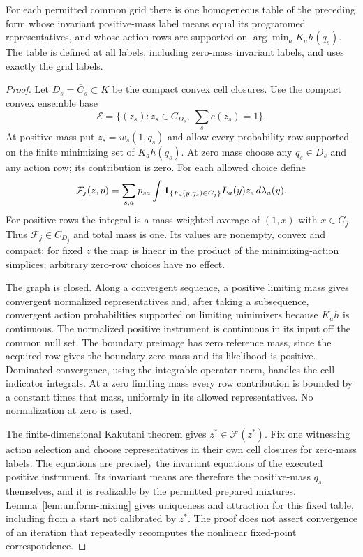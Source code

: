 \begin{lemma}\label{lem:fixedpoint}
For each permitted common grid there is one homogeneous table of the preceding form whose invariant positive-mass label means equal its programmed representatives, and whose action rows are supported on $\arg\min_a K_ah(q_s)$. The table is defined at all labels, including zero-mass invariant labels, and uses exactly the grid labels.
\end{lemma}
\begin{proof}
Let $D_s=\overline C_s\subset K$ be the compact convex cell closures. Use the compact convex ensemble base
\[
 \mathcal E=\{(z_s):z_s\in C_{D_s},\ \sum_s e(z_s)=1\}.
\]
At positive mass put $z_s=w_s(1,q_s)$ and allow every probability row supported on the finite minimizing set of $K_ah(q_s)$. At zero mass choose any $q_s\in D_s$ and any action row; its contribution is zero. For each allowed choice define
\begin{equation}\label{eq:fixedj}
 \mathcal F_j(z,p)=\sum_{s,a}p_{sa}
   \int\mathbf 1_{\{F_a(y,q_s)\in C_j\}}L_a(y)z_s\,d\lambda_a(y).
\end{equation}
For positive rows the integral is a mass-weighted average of $(1,x)$ with $x\in C_j$. Thus $\mathcal F_j\in C_{D_j}$ and total mass is one. Its values are nonempty, convex and compact: for fixed $z$ the map is linear in the product of the minimizing-action simplices; arbitrary zero-row choices have no effect.

The graph is closed. Along a convergent sequence, a positive limiting mass gives convergent normalized representatives and, after taking a subsequence, convergent action probabilities supported on limiting minimizers because $K_ah$ is continuous. The normalized positive instrument is continuous in its input off the common null set. The boundary preimage has zero reference mass, since the acquired row gives the boundary zero mass and its likelihood is positive. Dominated convergence, using the integrable operator norm, handles the cell indicator integrals. At a zero limiting mass every row contribution is bounded by a constant times that mass, uniformly in its allowed representatives. No normalization at zero is used.

The finite-dimensional Kakutani theorem \cite{Kakutani1941} gives $z^*\in\mathcal F(z^*)$. Fix one witnessing action selection and choose representatives in their own cell closures for zero-mass labels. The equations are precisely the invariant equations of the executed positive instrument. Its invariant means are therefore the positive-mass $q_s$ themselves, and it is realizable by the permitted prepared mixtures. Lemma~\ref{lem:uniform-mixing} gives uniqueness and attraction for this fixed table, including from a start not calibrated by $z^*$. The proof does not assert convergence of an iteration that repeatedly recomputes the nonlinear fixed-point correspondence.
\end{proof}


